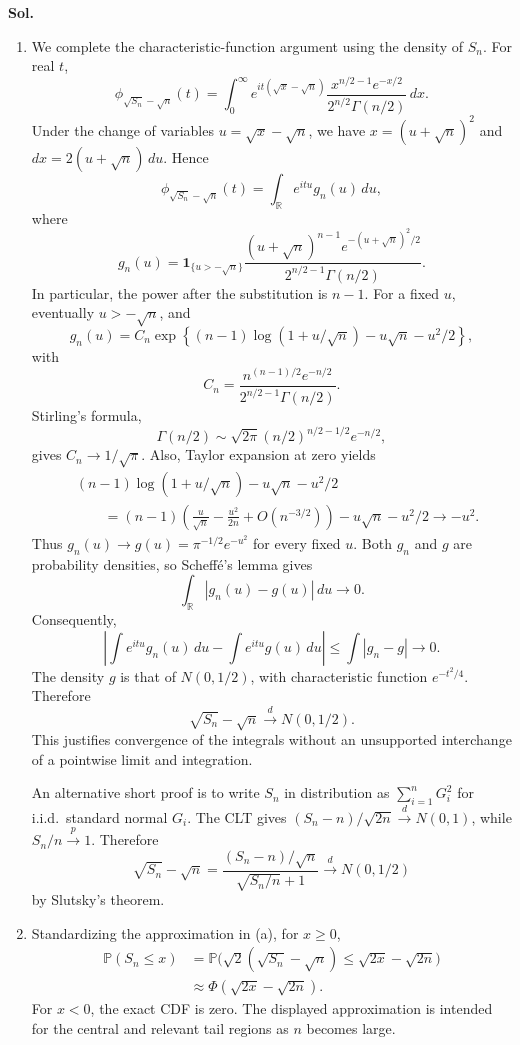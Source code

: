 \documentclass[lang=en,11pt,a4paper,citestyle=authoryear]{elegantpaper}
\newcommand{\R}{\mathbb{R}}
\renewcommand{\P}{\mathbb{P}}
\begin{document}
\par\vspace{0.5em}\noindent\textbf{Sol.}\par
\begin{enumerate}[label=(\alph*),leftmargin=*]
\item We complete the characteristic-function argument using the
density of $S_n$. For real $t$,
\[
\phi_{\sqrt{S_n}-\sqrt n}(t)
=\int_0^\infty e^{it(\sqrt x-\sqrt n)}
\frac{x^{n/2-1}e^{-x/2}}{2^{n/2}\Gamma(n/2)}\,dx.
\]
Under the change of variables $u=\sqrt x-\sqrt n$,
we have $x=(u+\sqrt n)^2$ and $dx=2(u+\sqrt n)\,du$.
Hence
\[
\phi_{\sqrt{S_n}-\sqrt n}(t)
=\int_{\R}e^{itu}g_n(u)\,du,
\]
where
\[
g_n(u)=\mathbf1_{\{u>-\sqrt n\}}
\frac{(u+\sqrt n)^{n-1}e^{-(u+\sqrt n)^2/2}}
{2^{n/2-1}\Gamma(n/2)}.
\]
In particular, the power after the substitution is $n-1$.
For a fixed $u$, eventually $u>-\sqrt n$, and
\[
g_n(u)=C_n\exp\left\{
(n-1)\log(1+u/\sqrt n)-u\sqrt n-u^2/2
\right\},
\]
with
\[
C_n=\frac{n^{(n-1)/2}e^{-n/2}}
{2^{n/2-1}\Gamma(n/2)}.
\]
Stirling's formula,
\[
\Gamma(n/2)\sim\sqrt{2\pi}(n/2)^{n/2-1/2}e^{-n/2},
\]
gives $C_n\to1/\sqrt\pi$. Also, Taylor expansion at zero yields
\[
\begin{aligned}
&(n-1)\log(1+u/\sqrt n)-u\sqrt n-u^2/2\\
&\qquad=(n-1)\left(\frac u{\sqrt n}-\frac{u^2}{2n}
+O(n^{-3/2})\right)-u\sqrt n-u^2/2
\longrightarrow -u^2.
\end{aligned}
\]
Thus $g_n(u)\to g(u)=\pi^{-1/2}e^{-u^2}$ for every fixed $u$.
Both $g_n$ and $g$ are probability densities, so Scheff\'e's lemma gives
\[
\int_{\R}|g_n(u)-g(u)|\,du\longrightarrow0.
\]
Consequently,
\[
\left|\int e^{itu}g_n(u)\,du-\int e^{itu}g(u)\,du\right|
\le\int|g_n-g|\longrightarrow0.
\]
The density $g$ is that of $N(0,1/2)$, with characteristic function
$e^{-t^2/4}$. Therefore
\[
\boxed{\sqrt{S_n}-\sqrt n\xrightarrow dN(0,1/2).}
\]
This justifies convergence of the integrals without an unsupported
interchange of a pointwise limit and integration.

An alternative short proof is to write $S_n$ in distribution as
$\sum_{i=1}^nG_i^2$ for i.i.d.\ standard normal $G_i$. The CLT gives
$(S_n-n)/\sqrt{2n}\xrightarrow dN(0,1)$, while $S_n/n\xrightarrow p1$.
Therefore
\[
\sqrt{S_n}-\sqrt n
=\frac{(S_n-n)/\sqrt n}{\sqrt{S_n/n}+1}
\xrightarrow dN(0,1/2)
\]
by Slutsky's theorem.

\item Standardizing the approximation in (a), for $x\ge0$,
\[
\begin{aligned}
\P(S_n\le x)
&=\P\bigl(\sqrt2(\sqrt{S_n}-\sqrt n)
\le\sqrt{2x}-\sqrt{2n}\bigr)\\
&\approx\Phi(\sqrt{2x}-\sqrt{2n}).
\end{aligned}
\]
For $x<0$, the exact CDF is zero. The displayed approximation is
intended for the central and relevant tail regions as $n$ becomes large.


\end{enumerate}
\end{document}
